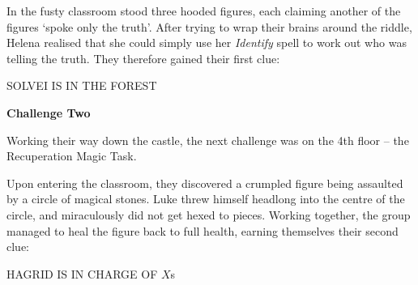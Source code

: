 \documentclass[oneside]{book}
\begin{document}
In the fusty classroom stood three hooded figures, each claiming another of the figures `spoke only the truth'. After trying to wrap their brains around the riddle, Helena realised 
that she could simply use her {\it Identify} spell to work out who was telling the truth. They therefore gained their first clue:

\begin{center}
{SOLVEI IS IN THE FOREST}
\end{center}

{\bf Challenge Two}

Working their way down the castle, the next challenge was on the 4th floor -- the Recuperation Magic Task. 

Upon entering the classroom, they discovered a crumpled figure being assaulted by a circle of magical stones. Luke threw himself headlong into the centre of the circle, and miraculously did not get hexed to pieces. Working together, the group managed to heal the figure back to full health, earning themselves their second clue:

\begin{center}
{HAGRID IS IN CHARGE OF $X$s   }
\end{center}
\end{document}
